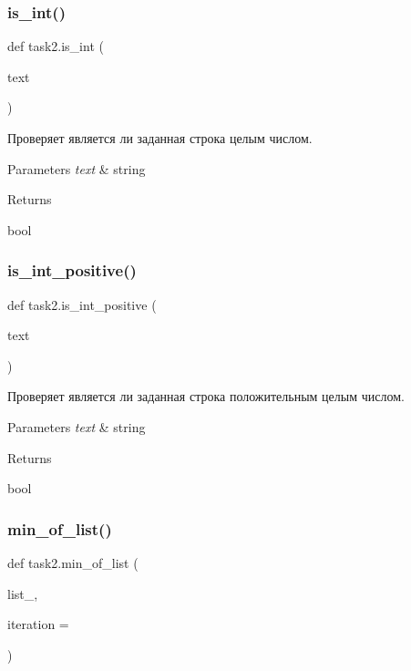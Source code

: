 \subsubsection{\texorpdfstring{is\+\_\+int()}{is\_int()}}
{\footnotesize\ttfamily def task2.\+is\+\_\+int (\begin{DoxyParamCaption}\item[{}]{text }\end{DoxyParamCaption})}



Проверяет является ли заданная строка целым числом. 


\begin{DoxyParams}{Parameters}
{\em text} & string\\
\hline
\end{DoxyParams}
\begin{DoxyReturn}{Returns}


bool 
\end{DoxyReturn}
\mbox{\label{namespacetask2_a00e73ab7ff2d5b208bc90e1ed19cee68}} 
\subsubsection{\texorpdfstring{is\+\_\+int\+\_\+positive()}{is\_int\_positive()}}
{\footnotesize\ttfamily def task2.\+is\+\_\+int\+\_\+positive (\begin{DoxyParamCaption}\item[{}]{text }\end{DoxyParamCaption})}



Проверяет является ли заданная строка положительным целым числом. 


\begin{DoxyParams}{Parameters}
{\em text} & string\\
\hline
\end{DoxyParams}
\begin{DoxyReturn}{Returns}


bool 
\end{DoxyReturn}
\mbox{\label{namespacetask2_a5eace687491dadb82911808fd7569efd}} 
\subsubsection{\texorpdfstring{min\+\_\+of\+\_\+list()}{min\_of\_list()}}
{\footnotesize\ttfamily def task2.\+min\+\_\+of\+\_\+list (\begin{DoxyParamCaption}\item[{}]{list\+\_\+,  }\item[{}]{iteration = {} }\end{DoxyParamCaption})}



